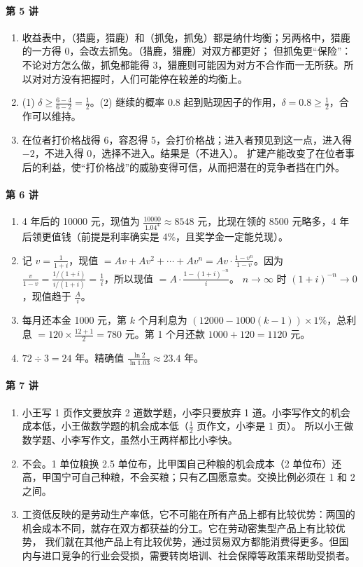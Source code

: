 \paragraph{第 5 讲}
\begin{enumerate}[label=5.\arabic*, leftmargin=2.6em]
  \item 收益表中，（猎鹿，猎鹿）和（抓兔，抓兔）都是纳什均衡；另两格中，猎鹿的一方得 0，会改去抓兔。（猎鹿，猎鹿）对双方都更好；
        但抓兔更“保险”：不论对方怎么做，抓兔都能得 3，猎鹿则可能因为对方不合作而一无所获。所以对对方没有把握时，人们可能停在较差的均衡上。
  \item (1) $\delta\ge\frac{6-4}{6-2}=\frac12$。(2) 继续的概率 0.8 起到贴现因子的作用，$\delta=0.8\ge\frac12$，合作可以维持。
  \item 在位者打价格战得 6，容忍得 5，会打价格战；进入者预见到这一点，进入得 $-2$，不进入得 0，选择不进入。结果是（不进入）。
        扩建产能改变了在位者事后的利益，使“打价格战”的威胁变得可信，从而把潜在的竞争者挡在门外。
\end{enumerate}

\paragraph{第 6 讲}
\begin{enumerate}[label=6.\arabic*, leftmargin=2.6em]
  \item 4 年后的 10000 元，现值为 $\frac{10000}{1.04^4}\approx8548$ 元，比现在领的 8500 元略多，4 年后领更值钱（前提是利率确实是 4\%，且奖学金一定能兑现）。
  \item 记 $v=\frac1{1+i}$，现值 $=Av+Av^2+\cdots+Av^n=Av\cdot\frac{1-v^n}{1-v}$。因为 $\frac{v}{1-v}=\frac{1/(1+i)}{i/(1+i)}=\frac1i$，所以现值 $=A\cdot\frac{1-(1+i)^{-n}}{i}$。
        $n\to\infty$ 时 $(1+i)^{-n}\to0$，现值趋于 $\frac Ai$。
  \item 每月还本金 1000 元，第 $k$ 个月利息为 $(12000-1000(k-1))\times1\%$，总利息 $=120\times\frac{12+1}{2}=780$ 元。第 1 个月还款 $1000+120=1120$ 元。
  \item $72\div3=24$ 年。精确值 $\frac{\ln2}{\ln1.03}\approx23.4$ 年。
\end{enumerate}

\paragraph{第 7 讲}
\begin{enumerate}[label=7.\arabic*, leftmargin=2.6em]
  \item 小王写 1 页作文要放弃 2 道数学题，小李只要放弃 1 道。小李写作文的机会成本低，小王做数学题的机会成本低（$\frac12$ 页作文，小李是 1 页）。
        所以小王做数学题、小李写作文，虽然小王两样都比小李快。
  \item 不会。1 单位粮换 2.5 单位布，比甲国自己种粮的机会成本（2 单位布）还高，甲国宁可自己种粮，不会买粮；只有乙国愿意卖。交换比例必须在 1 和 2 之间。
  \item 工资低反映的是劳动生产率低，它不可能在所有产品上都有比较优势：两国的机会成本不同，就存在双方都获益的分工。它在劳动密集型产品上有比较优势，
        我们就在其他产品上有比较优势，通过贸易双方都能消费得更多。但国内与进口竞争的行业会受损，需要转岗培训、社会保障等政策来帮助受损者。
\end{enumerate}

